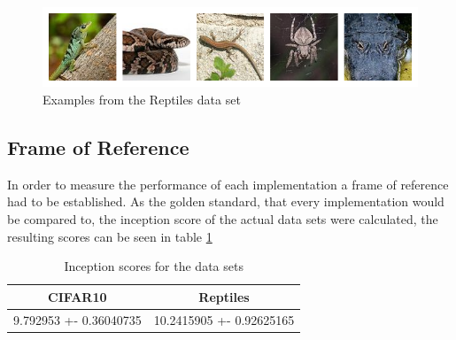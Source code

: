 \begin{figure}[h]
\centering
\includegraphics[width=\textwidth]{figures/reptiles.png}
\caption{Examples from the Reptiles data set}
\label{fig:reptiles}
\end{figure}




\subsection{Frame of Reference}
In order to measure the performance of each implementation a frame of reference had to be established. As the golden standard, that every implementation would be compared to, the inception score of the actual data sets were calculated, the resulting scores can be seen in table \ref{table:GS}

\begin{table}[]
\centering
\caption{Inception scores for the data sets}
\label{table:GS}
\begin{tabular}{c|c}
CIFAR10                   & Reptiles                    \\ \hline
9.792953 +- 0.36040735 & 10.2415905 +- 0.92625165
\end{tabular}
\end{table}


